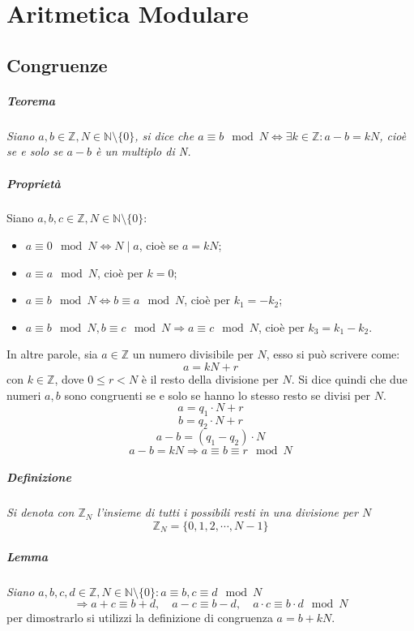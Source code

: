 \documentclass[a4paper]{report}
\begin{document}
\chapter{Aritmetica Modulare}
\section{Congruenze}
\paragraph{Teorema}
\textit{Siano $a,b\in \mathbb{Z}, N\in \mathbb{N}\setminus \{ 0\} $, si dice che $a\equiv b \mod{N} \Leftrightarrow \exists k\in \mathbb{Z}:a-b=kN$, cioè se e solo se $a-b$ è un multiplo di N.}
\paragraph{Proprietà} Siano $a,b,c\in \mathbb{Z}, N\in \mathbb{N}\setminus \{ 0\} $:

\begin{itemize}
\item $a\equiv 0 \mod{N} \Leftrightarrow N\mid a$, cioè se $a=kN$;
\item $a\equiv a\mod{N}$, cioè per $k=0$;
\item $a\equiv b\mod{N} \Leftrightarrow b\equiv a\mod{N}$, cioè per $k_1=-k_2$;
\item $a\equiv b\mod {N}, b\equiv c\mod{N} \Rightarrow a\equiv c\mod {N}$, cioè per $k_3=k_1-k_2$.
\end{itemize}

In altre parole, sia $a\in \mathbb{Z}$ un numero divisibile per $N$, esso si può scrivere come:
$$a=kN+r$$
con $k\in \mathbb{Z}$, dove $0\leq r < N$ è il resto della divisione per $N$. Si dice quindi che due numeri $a,b$ sono congruenti se e solo se hanno lo stesso resto se divisi per $N$.
$$a=q_1\cdot N + r$$
$$b=q_2\cdot N + r$$
$$a-b=(q_1-q_2)\cdot N$$
$$a-b=kN\Rightarrow a\equiv b\equiv r \mod{N}$$
\paragraph{Definizione} \textit{Si denota con $\mathbb{Z}_N$ l'insieme di tutti i possibili resti in una divisione per $N$}
$$\mathbb{Z}_N=\{0,1,2,\cdots,N-1\}$$
\paragraph{Lemma} \textit{Siano $a,b,c,d\in \mathbb{Z}, N\in \mathbb{N}\setminus \{ 0\} : a\equiv b, c\equiv d \mod{N}$}
$$\Rightarrow a+c\equiv b+d,\quad a-c\equiv b-d,\quad a\cdot c\equiv b\cdot d \mod{N}$$
per dimostrarlo si utilizzi la definizione di congruenza $a=b+kN$.
\end{document}
